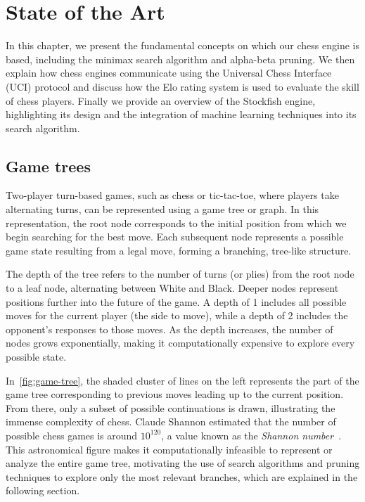 \chapter{State of the Art}\label{cap:estadoDeLaCuestion}

In this chapter, we present the fundamental concepts on which our chess engine is based, including the minimax search algorithm and alpha-beta pruning. We then explain how chess engines communicate using the Universal Chess Interface (UCI) protocol and discuss how the Elo rating system is used to evaluate the skill of chess players. Finally we provide an overview of the Stockfish engine, highlighting its design and the integration of machine learning techniques into its search algorithm.

\newpage
\section{Game trees}

\par Two-player turn-based games, such as chess or tic-tac-toe, where players take alternating turns, can be represented using a game tree or graph. In this representation, the root node corresponds to the initial position from which we begin searching for the best move. Each subsequent node represents a possible game state resulting from a legal move, forming a branching, tree-like structure.

\vspace{1em}

\par The depth of the tree refers to the number of turns (or plies) from the root node to a leaf node, alternating between White and Black. Deeper nodes represent positions further into the future of the game. A depth of 1 includes all possible moves for the current player (the side to move), while a depth of 2 includes the opponent's responses to those moves. As the depth increases, the number of nodes grows exponentially, making it computationally expensive to explore every possible state.

\vspace{1em}

\noindent In~\cref{fig:game-tree}, the shaded cluster of lines on the left represents the part of the game tree corresponding to previous moves leading up to the current position. From there, only a subset of possible continuations is drawn, illustrating the immense complexity of chess. Claude Shannon estimated that the number of possible chess games is around $10^{120}$, a value known as the \textit{Shannon number}~\cite{Shannon1950}. This astronomical figure makes it computationally infeasible to represent or analyze the entire game tree, motivating the use of search algorithms and pruning techniques to explore only the most relevant branches, which are explained in the following section.

